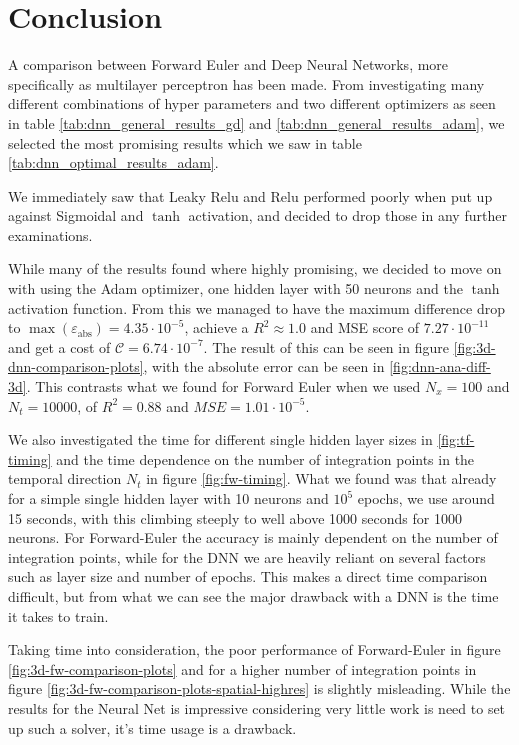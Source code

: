\section{Conclusion}
A comparison between Forward Euler and Deep Neural Networks, more specifically as multilayer perceptron has been made. From investigating many different combinations of hyper parameters and two different optimizers as seen in table \ref{tab:dnn_general_results_gd} and \ref{tab:dnn_general_results_adam}, we selected the most promising results which we saw in table \ref{tab:dnn_optimal_results_adam}. 

We immediately saw that Leaky Relu and Relu performed poorly when put up against Sigmoidal and $\tanh$ activation, and decided to drop those in any further examinations.

While many of the results found where highly promising, we decided to move on with using the Adam optimizer, one hidden layer with 50 neurons and the $\tanh$ activation function. From this we managed to have the maximum difference drop to $\max(\varepsilon_\mathrm{abs})=4.35\cdot 10^{-5}$, achieve a $R^2 \approx 1.0$ and MSE score of $7.27\cdot 10^{-11}$ and get a cost of $\mathcal{C} = 6.74 \cdot 10^{-7}$. The result of this can be seen in figure \ref{fig:3d-dnn-comparison-plots}, with the absolute error can be seen in \ref{fig:dnn-ana-diff-3d}. This contrasts what we found for Forward Euler when we used $N_x=100$ and $N_t=10000$, of $R^2=0.88$ and $MSE=1.01\cdot 10^{-5}$.

We also investigated the time for different single hidden layer sizes in \ref{fig:tf-timing} and the time dependence on the number of integration points in the temporal direction $N_t$ in figure \ref{fig:fw-timing}. What we found was that already for a simple single hidden layer with 10 neurons and $10^5$ epochs, we use around 15 seconds, with this climbing steeply to well above 1000 seconds for 1000 neurons. For Forward-Euler the accuracy is mainly dependent on the number of integration points, while for the DNN we are heavily reliant on several factors such as layer size and number of epochs. This makes a direct time comparison difficult, but from what we can see the major drawback with a DNN is the time it takes to train.

Taking time into consideration, the poor performance of Forward-Euler in figure \ref{fig:3d-fw-comparison-plots} and for a higher number of integration points in figure \ref{fig:3d-fw-comparison-plots-spatial-highres} is slightly misleading. While the results for the Neural Net is impressive considering very little work is need to set up such a solver, it's time usage is a drawback.


